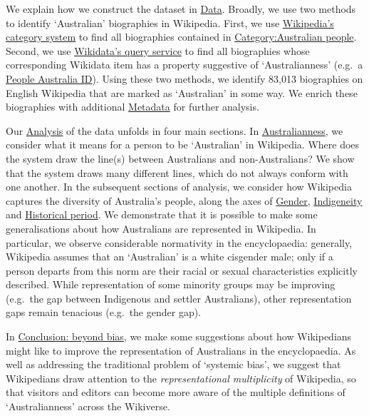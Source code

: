 \documentclass[
  a4paper,
  DIV=11,
  numbers=noendperiod]{scrreprt}
\begin{document}
We explain how we construct the dataset in
\protect\hyperlink{data}{Data}. Broadly, we use two methods to identify
`Australian' biographies in Wikipedia. First, we use
\protect\hyperlink{wikipedias-category-system}{Wikipedia's category
system} to find all biographies contained in
\href{https://en.wikipedia.org/wiki/Category:Australian_people}{Category:Australian
people}. Second, we use
\protect\hyperlink{wikidatas-query-service}{Wikidata's query service} to
find all biographies whose corresponding Wikidata item has a property
suggestive of `Australianness' (e.g.~a
\href{https://www.wikidata.org/wiki/Property:P9159}{People Australia
ID}). Using these two methods, we identify 83,013 biographies on English
Wikipedia that are marked as `Australian' in some way. We enrich these
biographies with additional \protect\hyperlink{metadata}{Metadata} for
further analysis.

Our \protect\hyperlink{analysis}{Analysis} of the data unfolds in four
main sections. In \protect\hyperlink{australianness}{Australianness}, we
consider what it means for a person to be `Australian' in Wikipedia.
Where does the system draw the line(s) between Australians and
non-Australians? We show that the system draws many different lines,
which do not always conform with one another. In the subsequent sections
of analysis, we consider how Wikipedia captures the diversity of
Australia's people, along the axes of
\protect\hyperlink{gender}{Gender},
\protect\hyperlink{indigeneity}{Indigeneity} and
\protect\hyperlink{historical-period}{Historical period}. We demonstrate
that it is possible to make some generalisations about how Australians
are represented in Wikipedia. In particular, we observe considerable
normativity in the encyclopaedia: generally, Wikipedia assumes that an
`Australian' is a white cisgender male; only if a person departs from
this norm are their racial or sexual characteristics explicitly
described. While representation of some minority groups may be improving
(e.g.~the gap between Indigenous and settler Australians), other
representation gaps remain tenacious (e.g.~the gender gap).

In \protect\hyperlink{conclusion-beyond-bias}{Conclusion: beyond bias},
we make some suggestions about how Wikipedians might like to improve the
representation of Australians in the encyclopaedia. As well as
addressing the traditional problem of `systemic bias', we suggest that
Wikipedians draw attention to the \emph{representational multiplicity}
of Wikipedia, so that visitors and editors can become more aware of the
multiple definitions of `Australianness' across the Wikiverse.
\end{document}
